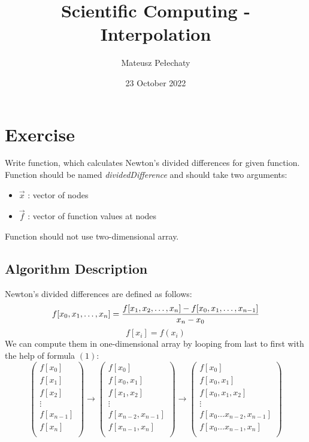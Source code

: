 \documentclass[11pt]{article}
\title{Scientific Computing - Interpolation}
\author{Mateusz Pełechaty}
\date{23 October 2022}%
\begin{document}
\maketitle

\section{Exercise}
Write function, which calculates Newton's divided differences for given function.
Function should be named \textit{dividedDifference} and should take two arguments: 
\begin{itemize}
    \item $\vec{x}$ : vector of nodes
    \item $\vec{f}$ : vector of function values at nodes
\end{itemize}
Function should not use two-dimensional array.
\subsection*{Algorithm Description}
Newton's divided differences are defined as follows:
\begin{equation}
    f[x_0, x_1, \dots, x_n] = \frac{f[x_1, x_2, \dots, x_n] - f[x_0, x_1, \dots, x_{n-1}]}{x_n - x_0}\\
\end{equation}
\begin{equation*}
    f[x_i] = f(x_i)
\end{equation*}
We can compute them in one-dimensional array by looping from last to first with the help of formula $(1)$:
\begin{equation*}
\begin{pmatrix}
    f[x_0] \\
    f[x_1] \\
    f[x_2] \\
    \vdots \\
    f[x_{n-1}] \\
    f[x_n] \\
\end{pmatrix}
\rightarrow
\begin{pmatrix}
    f[x_0] \\
    f[x_0,x_1] \\
    f[x_1, x_2] \\
    \vdots \\
    f[x_{n-2},x_{n-1}] \\
    f[x_{n-1}, x_n] \\
\end{pmatrix}
\rightarrow
\begin{pmatrix}
    f[x_0] \\
    f[x_0,x_1] \\
    f[x_0,x_1,x_2] \\
    \vdots \\
    f[x_0 \hdots x_{n-2},x_{n-1}] \\
    f[x_0 \hdots x_{n-1}, x_n] \\
\end{pmatrix}
\end{equation*}
\end{document}
